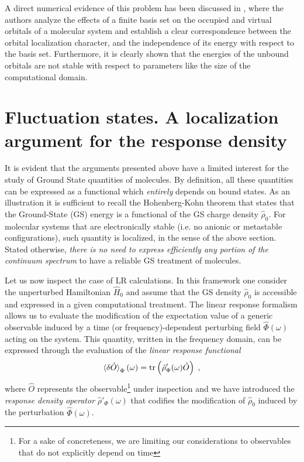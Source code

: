 \documentclass[reprint,aps,prb]{revtex4-1}
\newcommand{\be}{\begin{equation}}
\newcommand{\ee}{\end{equation}}
\newcommand{\lb}{\label}
\newcommand{\op}[1]{\hat {#1}}
\newcommand{\trace}[1]{\mathrm{tr}\left(#1\right)}
\newcommand{\dmnot}{\op{\rho}_0}
\newcommand{\dm}{\op{\rho}}
\newcommand{\hnot}{\op{H}_0}
\begin{document}
A direct numerical evidence of this problem has been discussed in \cite{boffi2016}, where the authors analyze the effects of a finite basis set on the
occupied and virtual orbitals of a molecular system and establish a clear correspondence between the orbital localization character,
and the independence of its energy with respect to the basis set.
Furthermore, it is clearly shown that the energies of the unbound orbitals are not stable with respect to parameters like the size of the computational domain.

\section{Fluctuation states. A localization argument for the response density}
\label{FluctuationState}
It is evident that the arguments presented above have a limited interest for the study
of Ground State quantities of molecules. By definition, all these quantities can be expressed as a
functional which \emph{entirely} depends on bound states. As an illustration it is sufficient to recall
the Hohenberg-Kohn theorem that states that the Ground-State (GS) energy is a functional of the GS
charge density $\dmnot$. For molecular systems that are electronically stable (i.e. no anionic or metastable configurations),
such quantity is localized, in the sense of the above section. Stated otherwise,
\emph{there is no need to express efficiently any portion of the continuum spectrum} to have a reliable GS treatment of molecules.

Let us now inspect the case of LR calculations.
In this framework one consider the unperturbed Hamiltonian $\hnot$ and assume that
the GS density $\dmnot$ is accessible and expressed in a given computational treatment.
The linear response formalism allows us to evaluate the modification of the expectation value of a generic observable induced by a
time (or frequency)-dependent perturbing field $\op\Phi(\omega)$ acting on the system.
This quantity, written in the frequency domain, can be expressed through the evaluation of the \emph{linear response functional}
\be\lb{LinearResponseFunctDef1}
\braket{\delta\op O}_\Phi(\omega) = \trace{\dm'_\Phi(\omega)\op O} \;,
\ee
where $\op O$ represents the observable\footnote{For a sake of concreteness, we are limiting our considerations to observables that do not explicitly depend on time} under inspection
and we have introduced the \emph{response density operator} $\dm'_\Phi(\omega)$ that codifies the modification of $\dmnot$ induced by the perturbation $\op\Phi(\omega)$.
\end{document}
